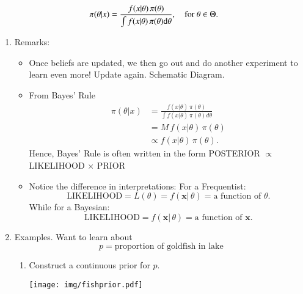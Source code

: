 \documentclass[11pt,english]{scrbook}
\begin{document}
\[
\pi(\theta|x)=\frac{f(x|\theta)\, \pi(\theta)}{\int f(x|\theta)\, \pi(\theta)
\mathrm{d}\theta}, \quad \mbox{for $\theta \in \Theta$.}
\]

\begin{enumerate}
\item Remarks:
\label{sec:org1de314d}

\begin{itemize}
\item Once beliefs are updated, we then go out and do another experiment to learn even more!  Update again.  Schematic Diagram.

\item From Bayes' Rule
\begin{align*}
\pi(\theta|x)&=\frac{f(x|\theta)\, \pi(\theta)}
{\int f(x|\theta)\, \pi(\theta)d\theta}\\
&= M \, f(x|\theta)\, \pi(\theta)\\
&\propto f(x|\theta)\, \pi(\theta).
\end{align*}
Hence, Bayes' Rule is often written in the form POSTERIOR \(\propto\) LIKELIHOOD \(\times\) PRIOR

\item Notice the difference in interpretations:
For a Frequentist:
\[
   \mbox{LIKELIHOOD}=L(\theta)=f(\mathbf{x}|\,\theta)= \mbox{a function of $\theta$}.
   \]
While for a Bayesian:
\[
   \mbox{LIKELIHOOD}=f(\mathbf{x}|\,\theta)= \mbox{a function of $\mathbf{x}$}.
   \]
\end{itemize}

\item Examples.
\label{sec:orgf9426d2}
Want to learn about
\[
p = \mbox{proportion of goldfish in lake}
\]

\begin{enumerate}
\item Construct a continuous prior for \(p\).

\begin{center}
\begin{center}
\texttt{[image: img/fishprior.pdf]}
\end{center}


\end{center}
\end{enumerate}
\end{enumerate}
\end{document}
